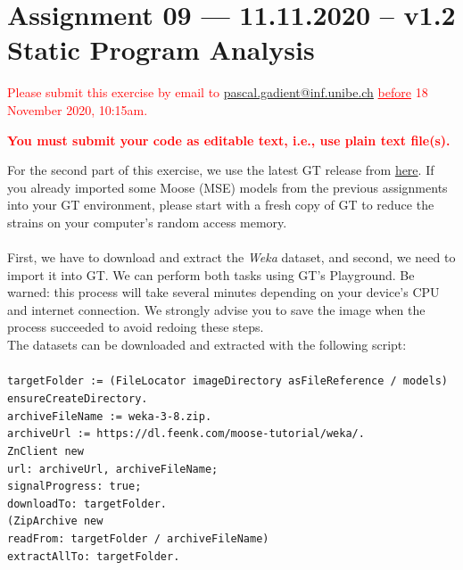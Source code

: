 \documentclass [11pt, a4wide, twoside]{article}
\begin{document}
\section*{Assignment 09 --- 11.11.2020 -- v1.2\\Static Program Analysis}

\textcolor{red}{Please submit this exercise by email to \href{mailto:pascal.gadient@inf.unibe.ch}{pascal.gadient@inf.unibe.ch} \underline{before} 18 November 2020, 10:15am.\begin{center}\textbf{You must submit your code as editable text, i.e., use plain text file(s).}\end{center}}

\noindent For the second part of this exercise, we use the latest GT release from \href{https://gtoolkit.com/download/}{here}. If you already imported some Moose (MSE) models from the previous assignments into your GT environment, please start with a fresh copy of GT to reduce the strains on your computer's random access memory.
\\\\
\noindent First, we have to download and extract the \emph{Weka} dataset, and second, we need to import it into GT. We can perform both tasks using GT's Playground. Be warned: this process will take several minutes depending on your device's CPU and internet connection. We strongly advise you to save the image when the process succeeded to avoid redoing these steps.\\

\noindent The datasets can be downloaded and extracted with the following script:\\\\
\texttt{targetFolder := (FileLocator imageDirectory asFileReference / \textquotesingle models\textquotesingle) ensureCreateDirectory.\\
archiveFileName := \textquotesingle weka-3-8.zip\textquotesingle.\\
archiveUrl := \textquotesingle https://dl.feenk.com/moose-tutorial/weka/\textquotesingle.\\
ZnClient new\\
\hspace*{0.5cm}url: archiveUrl, archiveFileName;\\
\hspace*{0.5cm}signalProgress: true;\\
\hspace*{0.5cm}downloadTo: targetFolder.\\
(ZipArchive new\\
\hspace*{0.5cm}readFrom: targetFolder / archiveFileName)\\
\hspace*{0.5cm}extractAllTo: targetFolder.}\\
\end{document}
